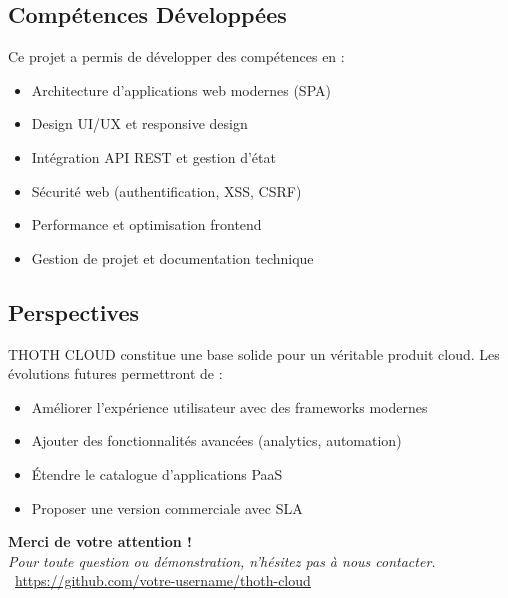 \documentclass[12pt,a4paper]{article}
\begin{document}
\subsection{Compétences Développées}

Ce projet a permis de développer des compétences en :

\begin{itemize}
    \item Architecture d'applications web modernes (SPA)
    \item Design UI/UX et responsive design
    \item Intégration API REST et gestion d'état
    \item Sécurité web (authentification, XSS, CSRF)
    \item Performance et optimisation frontend
    \item Gestion de projet et documentation technique
\end{itemize}

\subsection{Perspectives}

THOTH CLOUD constitue une base solide pour un véritable produit cloud. Les évolutions futures permettront de :

\begin{itemize}
    \item Améliorer l'expérience utilisateur avec des frameworks modernes
    \item Ajouter des fonctionnalités avancées (analytics, automation)
    \item Étendre le catalogue d'applications PaaS
    \item Proposer une version commerciale avec SLA
\end{itemize}

\vspace{1cm}
\begin{center}
\begin{tcolorbox}[colback=lightgreen,colframe=primarygreen,width=0.9\textwidth]
\centering
\Large\textbf{Merci de votre attention !}\\
\vspace{0.5cm}
\normalsize
\textit{Pour toute question ou démonstration, n'hésitez pas à nous contacter.}\\
\vspace{0.3cm}
\faGithub\ \url{https://github.com/votre-username/thoth-cloud}
\end{tcolorbox}
\end{center}
\end{document}
